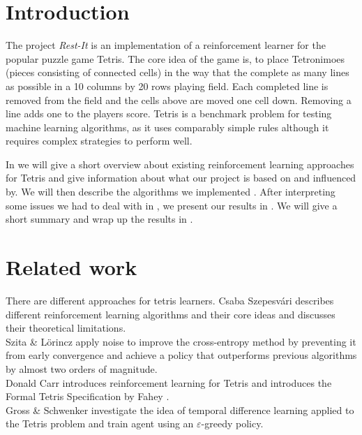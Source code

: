 \documentclass{ml}
\begin{document}


\section{Introduction}
\label{intro}
The project \textit{Rest-It} is an implementation of a reinforcement learner for the popular puzzle game Tetris. 
The core idea of the game is, to place Tetronimoes (pieces consisting of connected cells) in the way that the complete as many lines as possible in a 10 columns by 20 rows playing field.
Each completed line is removed from the field and the cells above are moved one cell down.
Removing a line adds one to the players score.
Tetris is a benchmark problem for testing machine learning algorithms, as it uses comparably simple rules although it requires complex strategies to perform well. 

In  we will give a short overview about existing reinforcement learning approaches for Tetris and give information about what our project is based on and influenced by.
We will then describe the algorithms we implemented .
After interpreting some issues we had to deal with in , we present our results in .
We will give a short summary and wrap up the results in .


\section{Related work}
\label{relatedwork}
There are different approaches for tetris learners. 
Csaba Szepesvári \cite{szepesvari2010algorithms} describes different reinforcement learning algorithms and their core ideas and discusses their theoretical  limitations. \\
Szita \&  L{\"o}rincz \cite{szita2006learning} apply noise to improve the cross-entropy method by preventing it from early convergence and achieve a policy that outperforms previous algorithms by almost two orders of magnitude.\\
Donald Carr introduces reinforcement learning for Tetris and introduces the Formal Tetris Specification by Fahey \cite{faheytetris}.\\
Gross \& Schwenker \cite{gross2008learningto} investigate the idea of temporal difference learning applied to the Tetris problem and train agent using an $\varepsilon$-greedy policy. 
\end{document}
